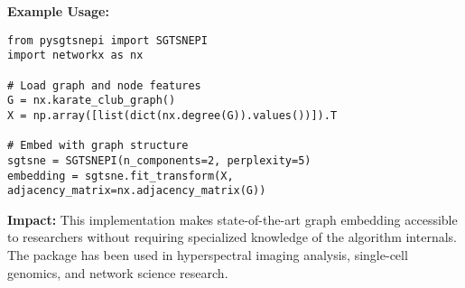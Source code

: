 \textbf{Example Usage:}
\begin{verbatim}
from pysgtsnepi import SGTSNEPI
import networkx as nx

# Load graph and node features
G = nx.karate_club_graph()
X = np.array([list(dict(nx.degree(G)).values())]).T

# Embed with graph structure
sgtsne = SGTSNEPI(n_components=2, perplexity=5)
embedding = sgtsne.fit_transform(X, adjacency_matrix=nx.adjacency_matrix(G))
\end{verbatim}

\textbf{Impact:} This implementation makes state-of-the-art graph embedding accessible to researchers without requiring specialized knowledge of the algorithm internals. The package has been used in hyperspectral imaging analysis, single-cell genomics, and network science research.


